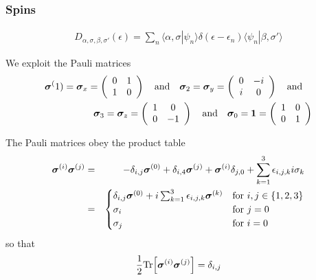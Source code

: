 \documentclass[11pt,a4paper]{report}
\begin{document}
\subsubsection{Spins}
\begin{eqnarray}
D_{\alpha,\sigma,\beta,\sigma'}(\epsilon)
=\sum_n \langle\alpha,\sigma|\psi_n\rangle \delta(\epsilon-\epsilon_n)
\langle\psi_n|\beta,\sigma'\rangle
\end{eqnarray}

We exploit the Pauli matrices
\begin{eqnarray}
\bm{\sigma}^(1)=\bm{\sigma}_x
=\left(\begin{array}{cc} 0&1\\1&0\end{array}\right)
\quad\text{and}\quad
\bm{\sigma}_2=\bm{\sigma}_y
=\left(\begin{array}{cc} 0&-i\\i&0\end{array}\right)
\quad\text{and}\quad
\nonumber\\
\bm{\sigma}_3=\bm{\sigma}_z
=\left(\begin{array}{cc} 1&0\\0&-1\end{array}\right)
\quad\text{and}\quad
\bm{\sigma}_0=\bm{1}
=\left(\begin{array}{cc} 1&0\\0&1\end{array}\right)
\end{eqnarray}

The Pauli matrices obey the product table
\begin{eqnarray}
\bm{\sigma}^{(i)}\bm{\sigma}^{(j)}&=&
-\delta_{i,j}\bm{\sigma}^{(0)}
+\delta_{i,4}\bm{\sigma}^{(j)}
+\bm{\sigma}^{(i)}\delta_{j,0}
+\sum_{k=1}^3 \epsilon_{i,j,k}i\sigma_k
\nonumber\\
&=&
\begin{cases}
\delta_{i,j}\bm{\sigma}^{(0)}+i\sum_{k=1}^3\epsilon_{i,j,k}\bm{\sigma}^{(k)}
&\text{for $i,j\in\{1,2,3\}$}\\
\sigma_i &\text{for $j=0$}\\
\sigma_j &\text{for $i=0$}
\end{cases}
\end{eqnarray}
so that
\begin{eqnarray}
\frac{1}{2}\mathrm{Tr}\Bigl[\bm{\sigma}^{(i)}\bm{\sigma}^{(j)}\Bigr]=\delta_{i,j}
\end{eqnarray}
\end{document}
